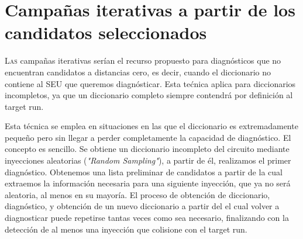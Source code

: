 \chapter{Campañas iterativas a partir de los candidatos seleccionados}
\label{ch:CampanasIterativas}

\lettrine[lraise=-0.1, lines=2, loversize=0.2]{L}{as} campañas iterativas serían
el recurso propuesto para diagnósticos que no encuentran candidatos a distancias
cero, es decir, cuando el diccionario no contiene al \gls{SEU} que queremos
diagnósticar. Esta tećnica aplica para diccionarios incompletos, ya que un
diccionario completo siempre contendrá por definición al target run.

Esta técnica se emplea en situaciones en las que el diccionario es extremadamente 
pequeño pero sin llegar a perder completamente la capacidad de diagnóstico. El
concepto es sencillo. Se obtiene un diccionario incompleto del circuito mediante
inyecciones aleatorias (\textit{"Random Sampling"}), a partir de él, realizamos el
primer diagnóstico. Obtenemos una lista preliminar de candidatos a partir de la
cual extraemos la información necesaria para una siguiente inyección, que ya no 
será aleatoria, al menos en su mayoría. El proceso de obtención de diccionario,
diagnóstico, y obtención de un nuevo diccionario a partir del el cual volver a
diagnosticar puede repetirse tantas veces como sea necesario, finalizando con la
detección de al menos una inyección que colisione con el target run.

